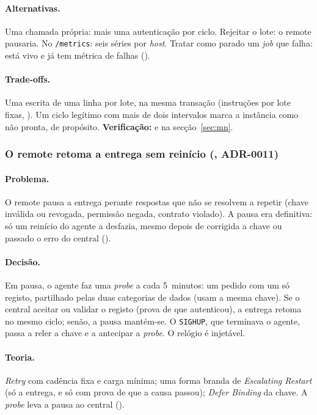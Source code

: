 \paragraph{Alternativas.}
Uma chamada própria: mais uma autenticação por ciclo. Rejeitar o lote: o remote pausaria. No \texttt{/metrics}:
seis séries por \emph{host}. Tratar como parado um \emph{job} que falha: está vivo e já tem métrica de falhas
().

\paragraph{Trade-offs.}
Uma escrita de uma linha por lote, na mesma transação (instruções por lote fixas, ). Um ciclo legítimo com
mais de dois intervalos marca a instância como não pronta, de propósito. \textbf{Verificação:}  e
 na secção~\ref{sec:mn}.

\subsubsection{O remote retoma a entrega sem reinício (, ADR-0011)}
\label{sec:d16}

\paragraph{Problema.}
O remote pausa a entrega perante respostas que não se resolvem a repetir (chave inválida ou revogada, permissão
negada, contrato violado). A pausa era definitiva: só um reinício do agente a desfazia, mesmo depois de corrigida a
chave ou passado o erro do central ().

\paragraph{Decisão.}
Em pausa, o agente faz uma \emph{probe} a cada 5~minutos: um pedido com um só registo, partilhado pelas duas
categorias de dados (usam a mesma chave). Se o central aceitar ou validar o registo (prova de que autenticou), a
entrega retoma no mesmo ciclo; senão, a pausa mantém-se. O \texttt{SIGHUP}, que terminava o agente, passa a reler a
chave e a antecipar a \emph{probe}. O relógio é injetável.

\paragraph{Teoria.}
\emph{Retry} com cadência fixa e carga mínima; uma forma branda de \emph{Escalating Restart} (só a entrega, e só
com prova de que a causa passou); \emph{Defer Binding} da chave. A \emph{probe} leva a pausa ao central ().

